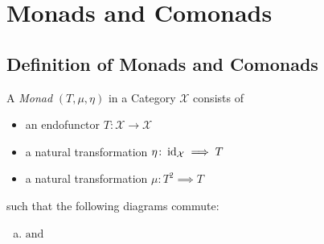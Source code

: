 \chapter{Monads and Comonads}
\section{Definition of Monads and Comonads}
\begin{definition}[Monad]
    A \textit{Monad} $(T,\mu, \eta) $ in a Category $\mathcal{X}$ consists of
    \begin{itemize}
        \item an endofunctor $T\colon \mathcal{X} \to \mathcal{X}$
        \item a natural transformation $\eta \colon \operatorname{id}_\mathcal{X} \implies T$ 
        \item a natural transformation $\mu\colon T^2 \implies T $
    \end{itemize}  
    such that the following diagrams commute:
    \begin{enumerate}[(a)]
    \item 
    \begin{minipage}{0.4\linewidth}
    \centering
    \end{minipage}
    $\mathrm{and}$
    \begin{minipage}{0.4\linewidth}
    \centering
    \end{minipage}
\end{enumerate}
\end{definition}

